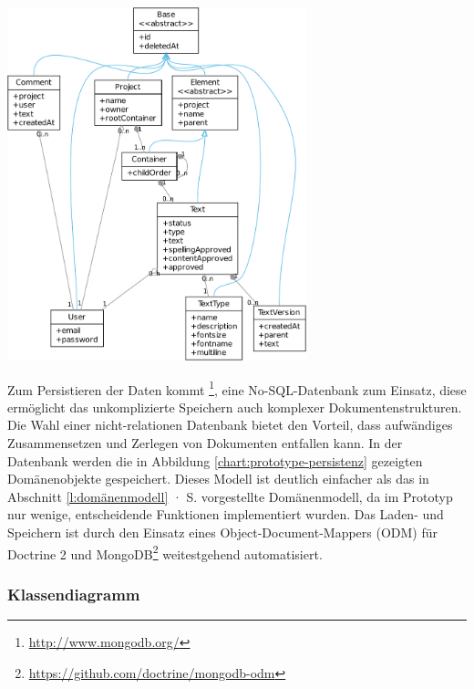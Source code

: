 \begin{center}
\includegraphics[width=0.65\textwidth]{media/prototyp-persistenz.pdf}
\label{chart:prototype-persistenz}
\end{center}

Zum Persistieren der Daten kommt \footnote{\url{http://www.mongodb.org/}}, eine No-SQL-Datenbank zum Einsatz, diese ermöglicht das unkomplizierte Speichern auch komplexer Dokumentenstrukturen. Die Wahl einer nicht-relationen Datenbank bietet den Vorteil, dass aufwändiges Zusammensetzen und Zerlegen von Dokumenten entfallen kann. In der Datenbank werden die in Abbildung \ref{chart:prototype-persistenz} gezeigten Domänenobjekte gespeichert. Dieses Modell ist deutlich einfacher als das in Abschnitt \ref{l:domänenmodell} · S.\pageref{l:domänenmodell} vorgestellte Domänenmodell, da im Prototyp nur wenige, entscheidende Funktionen implementiert wurden. Das Laden- und Speichern ist durch den Einsatz eines Object-Document-Mappers (ODM) für Doctrine 2 und MongoDB\footnote{\url{https://github.com/doctrine/mongodb-odm}} weitestgehend automatisiert. 

\subsubsection{Klassendiagramm}

